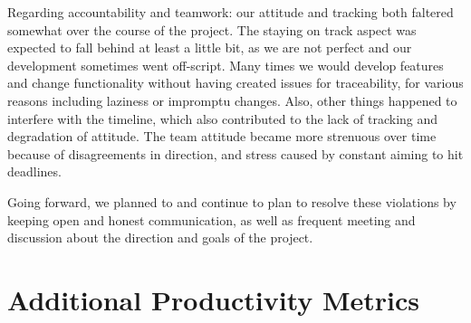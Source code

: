 \documentclass{article}
\begin{document}
Regarding accountability and teamwork: our attitude and tracking both
faltered somewhat over the course of the project. The staying on track aspect
was expected to fall behind at least a little bit, as we are not perfect and
our development sometimes went off-script. Many times we would develop features
and change functionality without having created issues for traceability, for
various reasons including laziness or impromptu changes. Also, other things
happened to interfere with the timeline, which also contributed to the lack of
tracking and degradation of attitude. The team attitude became more strenuous
over time because of disagreements in direction, and stress caused by constant
aiming to hit deadlines.

Going forward, we planned to and continue to plan to resolve these violations
by keeping open and honest communication, as well as frequent meeting and
discussion about the direction and goals of the project.

\section{Additional Productivity Metrics}

\end{document}
